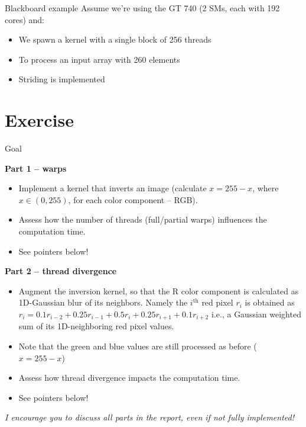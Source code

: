 \documentclass[11pt,t]{beamer}
\begin{document}
\begin{frame}{Blackboard example}
    Assume we're using the GT 740 (2 SMs, each with 192 cores) and:
    \begin{itemize}\setlength\itemsep{0.5em}\vspace{1mm}
        \item We spawn a kernel with a single block of 256 threads
        \item To process an input array with 260 elements
        \item Striding is implemented
    \end{itemize}
\end{frame}


\section{Exercise}

\begin{frame}{Goal}

    \textbf{Part 1 -- warps}
    \begin{itemize}\setlength\itemsep{0.5em}\vspace{1mm}
        \item Implement a kernel that inverts an image (calculate $x = 255 - x$, where $x \in (0, 255)$, for each color component -- RGB).
        \item Assess how the number of threads (full/partial warps) influences the computation time.
        \item See pointers below!
    \end{itemize}

\end{frame}
\begin{frame}
    \textbf{Part 2 -- thread divergence}
    \begin{itemize}\setlength\itemsep{0.5em}\vspace{1mm}
        \item Augment the inversion kernel, so that the R color component is calculated as 1D-Gaussian blur of its neighbors. Namely the $i^{\mathrm{th}}$ red pixel $r_i$ is obtained as $r_i = 0.1 r_{i-2} + 0.25 r_{i-1} + 0.5 r_i + 0.25 r_{i+1} + 0.1 r_{i+2}$ i.e., a Gaussian weighted sum of its 1D-neighboring red pixel values. 
        \item  Note that the green and blue values are still processed as before ( $x = 255 - x$)
        \item Assess how thread divergence impacts the computation time.
        \item See pointers below!
    \end{itemize}

    { \textit{I encourage you to discuss all parts in the report, even if not fully implemented!}}
    
\end{frame}
\end{document}

